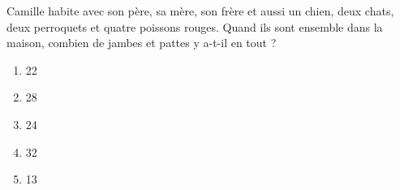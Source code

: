 Camille habite avec son père, sa mère, son frère et aussi un chien, deux chats, deux perroquets et quatre poissons rouges. Quand ils sont ensemble dans la maison, combien de jambes et pattes y a-t-il en tout ?
\begin{multicols}{5}
  \begin{enumerate}[A/]
    \item 22
    \item 28
    \item 24
    \item 32
    \item 13
  \end{enumerate}
\end{multicols}